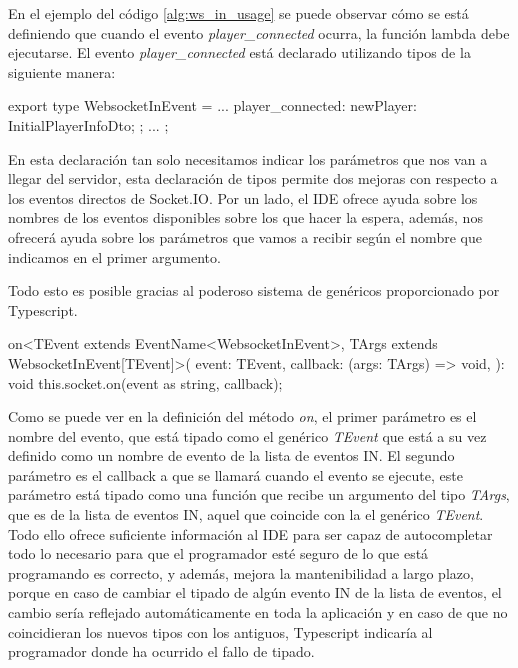 En el ejemplo del código \ref{alg:ws_in_usage} se puede observar cómo se está definiendo que cuando el evento \textit{player\_connected} ocurra, la función lambda debe ejecutarse. El evento \textit{player\_connected} está declarado utilizando tipos de la siguiente manera:

\begin{mytypescript}[float={!h},caption={Ejemplo de declaración de la comunicación IN.},label={alg:player_connected_type}]
	export type WebsocketInEvent = {
		...
		player_connected: {
			newPlayer: InitialPlayerInfoDto;
		};
		...
	};
\end{mytypescript}

En esta declaración tan solo necesitamos indicar los parámetros que nos van a llegar del servidor, esta declaración de tipos permite dos mejoras con respecto a los eventos directos de Socket.IO. Por un lado, el IDE ofrece ayuda sobre los nombres de los eventos disponibles sobre los que hacer la espera, además, nos ofrecerá ayuda sobre los parámetros que vamos a recibir según el nombre que indicamos en el primer argumento.

Todo esto es posible gracias al poderoso sistema de genéricos proporcionado por Typescript.

\begin{mytypescript}[float={!h},caption={Declaración del método \textit{on}.},label={alg:on_method}]
	on<TEvent extends EventName<WebsocketInEvent>, TArgs extends WebsocketInEvent[TEvent]>(
	event: TEvent,
	callback: (args: TArgs) => void,
	): void {
		this.socket.on(event as string, callback);
	}
\end{mytypescript}

Como se puede ver en la definición del método \textit{on}, el primer parámetro es el nombre del evento, que está tipado como el genérico \textit{TEvent} que está a su vez definido como un nombre de evento de la lista de eventos IN. El segundo parámetro es el callback a que se llamará cuando el evento se ejecute, este parámetro está tipado como una función que recibe un argumento del tipo \textit{TArgs}, que es de la lista de eventos IN, aquel que coincide con la el genérico \textit{TEvent}. Todo ello ofrece suficiente información al IDE para ser capaz de autocompletar todo lo necesario para que el programador esté seguro de lo que está programando es correcto, y además, mejora la mantenibilidad a largo plazo, porque en caso de cambiar el tipado de algún evento IN de la lista de eventos, el cambio sería reflejado automáticamente en toda la aplicación y en caso de que no coincidieran los nuevos tipos con los antiguos, Typescript indicaría al programador donde ha ocurrido el fallo de tipado.

